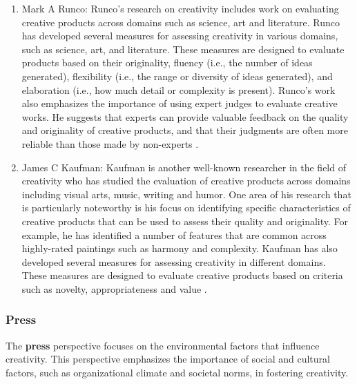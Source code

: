 \begin{enumerate}
\item Mark A Runco: Runco's research on creativity includes work on evaluating creative products across domains such as science, art and literature. Runco has developed several measures for assessing creativity in various domains, such as science, art, and literature. These measures are designed to evaluate products based on their originality, fluency (i.e., the number of ideas generated), flexibility (i.e., the range or diversity of ideas generated), and elaboration (i.e., how much detail or complexity is present). Runco's work also emphasizes the importance of using expert judges to evaluate creative works. He suggests that experts can provide valuable feedback on the quality and originality of creative products, and that their judgments are often more reliable than those made by non-experts \citep{Runco2014}.

\item James C Kaufman: Kaufman is another well-known researcher in the field of creativity who has studied the evaluation of creative products across domains including visual arts, music, writing and humor. One area of his research that is particularly noteworthy is his focus on identifying specific characteristics of creative products that can be used to assess their quality and originality. For example, he has identified a number of features that are common across highly-rated paintings such as harmony and complexity. Kaufman has also developed several measures for assessing creativity in different domains. These measures are designed to evaluate creative products based on criteria such as novelty, appropriateness and value \citep{Kaufman2019, Kaufman2016}.
\end{enumerate}

\subsubsection{Press}

The \textbf{press} perspective focuses on the environmental factors that influence creativity. This perspective emphasizes the importance of social and cultural factors, such as organizational climate and societal norms, in fostering creativity.


